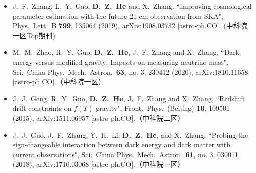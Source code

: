 \begin{itemize}[leftmargin=*]
    \item J.~F.~Zhang, L.~Y.~Gao, \textbf{D.~Z.~He} and X.~Zhang, ``Improving cosmological parameter estimation with the future 21 cm observation from SKA", Phys.\ Lett.\ B {\bf 799}, 135064 (2019), arXiv:1908.03732 [astro-ph.CO]. (中科院一区Top期刊)
     
    \item  M.~M.~Zhao, R.~Y.~Guo, \textbf{D.~Z.~He}, J.~F.~Zhang and X.~Zhang, ``Dark energy versus modified gravity: Impacts on measuring neutrino mass", Sci.\ China Phys.\ Mech.\ Astron.\ {\bf 63}, no. 3, 230412 (2020), arXiv:1810.11658 [astro-ph.CO].（中科院一区）
 
    \item J.~J.~Geng, R.~Y.~Guo, \textbf{D.~Z.~He}, J.~F.~Zhang and X.~Zhang, ``Redshift drift constraints on $f(T)$ gravity", Front.\ Phys.\ (Beijing) {\bf 10}, 109501      (2015), arXiv:1511.06957 [astro-ph.CO].（中科院二区）
  
    \item J.~J.~Guo, J.~F.~Zhang, Y.~H.~Li, \textbf{D.~Z.~He}, and X.~Zhang, ``Probing the sign-changeable interaction between dark energy and dark matter with current observations", Sci.\ China Phys.\ Mech.\ Astron.\ {\bf 61}, no. 3, 030011 (2018), arXiv:1710.03068 [astro-ph.CO].（中科院一区）
    
  \end{itemize}